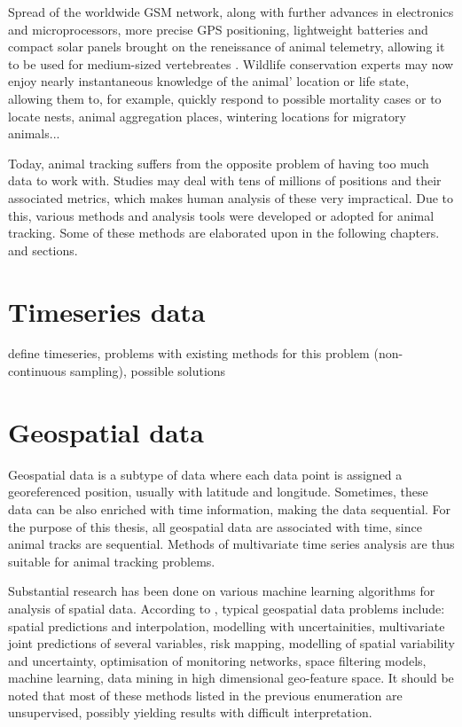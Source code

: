 Spread of the worldwide GSM network, along with further advances in electronics and microprocessors, more precise GPS positioning, lightweight batteries and compact solar panels brought on the reneissance of animal telemetry, allowing it to be used for medium-sized vertebreates \cite{kays2015terrestrial}. Wildlife conservation experts may now enjoy nearly instantaneous knowledge of the animal' location or life state, allowing them to, for example, quickly respond to possible mortality cases or to locate nests, animal aggregation places, wintering locations for migratory animals... 


Today, animal tracking suffers from the opposite problem of having too much data to work with. Studies may deal with tens of millions of positions and their associated metrics, which makes human analysis of these very impractical. Due to this, various methods and analysis tools were developed or adopted for animal tracking. Some of these methods are elaborated upon in the following chapters. and sections.

\section{Timeseries data}

define timeseries, problems with existing methods for this problem (non-continuous sampling), possible solutions

\section{Geospatial data}

Geospatial data is a subtype of data where each data point is assigned a georeferenced position, usually with latitude and longitude. Sometimes, these data can be also enriched with time information, making the data sequential. For the purpose of this thesis, all geospatial data are associated with time, since animal tracks are sequential. Methods of multivariate time series analysis are thus suitable for animal tracking problems.

Substantial research has been done on various machine learning algorithms for analysis of spatial data. According to \citeauthor{kanevski2008machine}, typical geospatial data problems include: spatial predictions and interpolation, modelling with uncertainities, multivariate joint predictions of several variables, risk mapping, modelling of spatial variability and uncertainty, optimisation of monitoring networks, space filtering models, machine learning, data mining in high dimensional geo-feature space. It should be noted that most of these methods listed in the previous enumeration are unsupervised, possibly yielding results with difficult interpretation.


